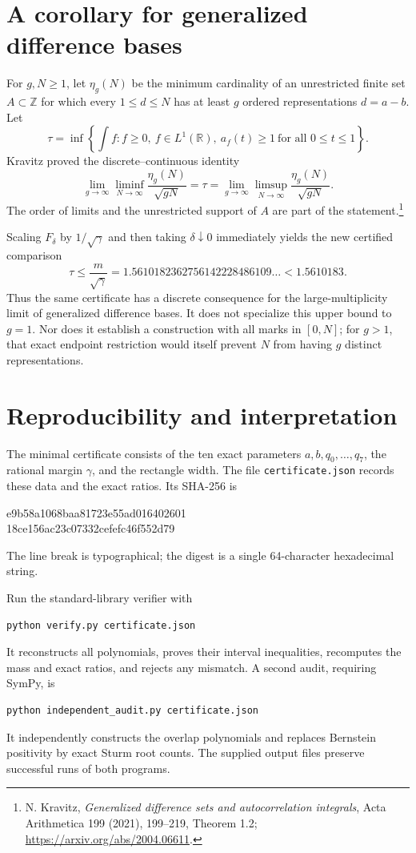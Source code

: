 \documentclass[11pt,a4paper]{article}
\theoremstyle{remark}\newtheorem{remark}[theorem]{Remark}
\newcommand{\R}{\mathbb R}
\newcommand{\Z}{\mathbb Z}
\begin{document}
\section{A corollary for generalized difference bases}
For $g,N\ge1$, let $\eta_g(N)$ be the minimum cardinality of an unrestricted finite set $A\subset\Z$ for which every $1\le d\le N$ has at least $g$ ordered representations $d=a-b$. Let
\[
 \tau=\inf\left\{\int f:f\ge0,\ f\in L^1(\R),\ a_f(t)\ge1\ \text{for all }0\le t\le1\right\}.
\]
Kravitz proved the discrete--continuous identity
\[
 \lim_{g\to\infty}\liminf_{N\to\infty}\frac{\eta_g(N)}{\sqrt{gN}}
 =\tau=
 \lim_{g\to\infty}\limsup_{N\to\infty}\frac{\eta_g(N)}{\sqrt{gN}}.
\]
The order of limits and the unrestricted support of $A$ are part of the statement.\footnote{N. Kravitz, \emph{Generalized difference sets and autocorrelation integrals}, Acta Arithmetica 199 (2021), 199--219, Theorem 1.2; \url{https://arxiv.org/abs/2004.06611}.}

Scaling $F_\delta$ by $1/\sqrt\gamma$ and then taking $\delta\downarrow0$ immediately yields the new certified comparison
\begin{equation}\label{eq:tau}
 \tau\le\frac m{\sqrt\gamma}
 =1.5610182362756142228486109\ldots<1.5610183.
\end{equation}
Thus the same certificate has a discrete consequence for the large-multiplicity limit of generalized difference bases. It does not specialize this upper bound to $g=1$. Nor does it establish a construction with all marks in $[0,N]$; for $g>1$, that exact endpoint restriction would itself prevent $N$ from having $g$ distinct representations.

\section{Reproducibility and interpretation}
The minimal certificate consists of the ten exact parameters $a,b,q_0,\ldots,q_7$, the rational margin $\gamma$, and the rectangle width. The file \texttt{certificate.json} records these data and the exact ratios. Its SHA-256 is
\begin{center}\small\ttfamily
 e9b58a1068baa81723e55ad016402601\\
 18ce156ac23c07332cefefc46f552d79
\end{center}
The line break is typographical; the digest is a single 64-character hexadecimal string.

Run the standard-library verifier with
\begin{lstlisting}[basicstyle=\ttfamily\small]
python verify.py certificate.json
\end{lstlisting}
It reconstructs all polynomials, proves their interval inequalities, recomputes the mass and exact ratios, and rejects any mismatch. A second audit, requiring SymPy, is
\begin{lstlisting}[basicstyle=\ttfamily\small]
python independent_audit.py certificate.json
\end{lstlisting}
It independently constructs the overlap polynomials and replaces Bernstein positivity by exact Sturm root counts. The supplied output files preserve successful runs of both programs.
\end{document}

